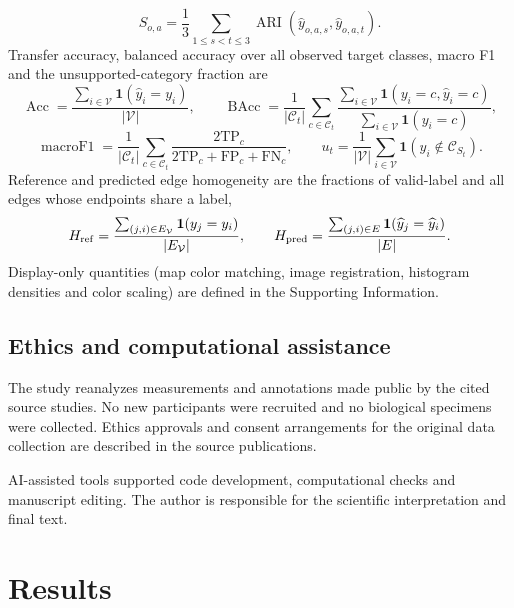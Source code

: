 \documentclass[11pt]{article}
\begin{document}
\begin{equation}
S_{o,a}=\frac13\sum_{1\leq s<t\leq3}\operatorname{ARI}(\widehat y_{o,a,s},\widehat y_{o,a,t}).\label{eq:stability}
\end{equation}
Transfer accuracy, balanced accuracy over all observed target classes, macro F1 and the unsupported-category fraction are
\begin{equation}
\operatorname{Acc}=\frac{\sum_{i\in\mathcal V}\mathbf1(\widehat y_i=y_i)}{|\mathcal V|},\qquad
\operatorname{BAcc}=\frac{1}{|\mathcal C_t|}\sum_{c\in\mathcal C_t}
\frac{\sum_{i\in\mathcal V}\mathbf1(y_i=c,\widehat y_i=c)}{\sum_{i\in\mathcal V}\mathbf1(y_i=c)},\label{eq:accuracy}
\end{equation}
\begin{equation}
\operatorname{macroF1}=\frac{1}{|\mathcal C_t|}\sum_{c\in\mathcal C_t}
\frac{2\mathrm{TP}_c}{2\mathrm{TP}_c+\mathrm{FP}_c+\mathrm{FN}_c},\qquad
u_t=\frac{1}{|\mathcal V|}\sum_{i\in\mathcal V}\mathbf1(y_i\notin\mathcal C_{S_t}).\label{eq:f1}
\end{equation}
Reference and predicted edge homogeneity are the fractions of valid-label and all edges whose endpoints share a label,
\begin{equation}
H_{\rm ref}=\frac{\sum_{(j,i)\in E_{\mathcal V}}\mathbf1(y_j=y_i)}{|E_{\mathcal V}|},\qquad
H_{\rm pred}=\frac{\sum_{(j,i)\in E}\mathbf1(\widehat y_j=\widehat y_i)}{|E|}.\label{eq:homogeneity}
\end{equation}
Display-only quantities (map color matching, image registration, histogram densities and color scaling) are defined in the Supporting Information.

\subsection{Ethics and computational assistance}
The study reanalyzes measurements and annotations made public by the cited source studies. No new participants were recruited and no biological specimens were collected. Ethics approvals and consent arrangements for the original data collection are described in the source publications.


AI-assisted tools supported code development, computational checks and manuscript editing. The author is responsible for the scientific interpretation and final text.

\section{Results}
\end{document}
